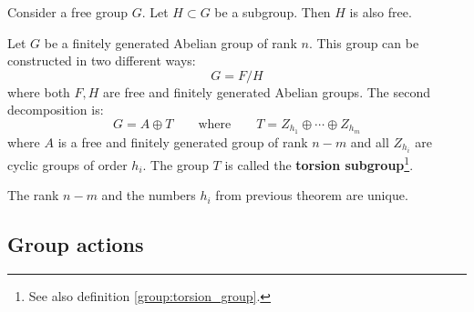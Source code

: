 	\begin{property}
		Consider a free group $G$. Let $H\subset G$ be a subgroup. Then $H$ is also free.
	\end{property}
	
	\begin{theorem}\label{group:theorem:free_group}
		Let $G$ be a finitely generated Abelian group of rank $n$. This group can be constructed in two different ways:
		\begin{equation}
			G = F/H
		\end{equation}
		where both $F, H$ are free and finitely generated Abelian groups. The second decomposition is:
		\begin{equation}
			G = A\oplus T\qquad\text{where}\qquad T = Z_{h_1}\oplus\cdots\oplus Z_{h_m}
		\end{equation}
		where $A$ is a free and finitely generated group of rank $n-m$ and all $Z_{h_i}$ are cyclic groups of order $h_i$. The group $T$ is called the \textbf{torsion subgroup}\footnote{See also definition \ref{group:torsion_group}.}.
	\end{theorem}
	
	\begin{property}
		The rank $n-m$ and the numbers $h_i$ from previous theorem are unique.
	\end{property}

\subsection{Group actions}

        
